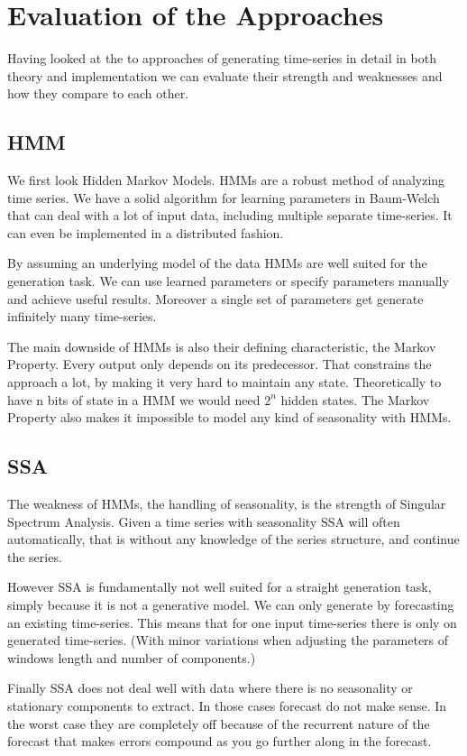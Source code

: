 
\chapter{Evaluation of the Approaches}\label{chapter:evaluation}

Having looked at the to approaches of generating time-series in detail in both theory and implementation we can evaluate their strength and weaknesses and how they compare to each other. 

\section{HMM}

We first look Hidden Markov Models. HMMs are a robust method of analyzing time series. We have a solid algorithm for learning parameters in Baum-Welch that can deal with a lot of input data, including multiple separate time-series. It can even be implemented in a distributed fashion. 

By assuming an underlying model of the data HMMs are well suited for the generation task. We can use learned parameters or specify parameters manually and achieve useful results. Moreover a single set of parameters get generate infinitely many time-series. 

The main downside of HMMs is also their defining characteristic, the Markov Property. Every output only depends on its predecessor. That constrains the approach a lot, by making it very hard to maintain any state. Theoretically to have n bits of state in a HMM we would need $2^n$ hidden states. The Markov Property also makes it impossible to model any kind of seasonality with HMMs. 

\section{SSA}

The weakness of HMMs, the handling of seasonality, is the strength of Singular Spectrum Analysis. Given a time series with seasonality SSA will often automatically, that is without any knowledge of the series structure, and continue the series. 

However SSA is fundamentally not well suited for a straight generation task, simply because it is not a generative model. We can only generate by forecasting an existing time-series. This means that for one input time-series there is only on generated time-series. (With minor variations when adjusting the parameters of windows length and number of components.)

Finally SSA does not deal well with data where there is no seasonality or stationary components to extract. In those cases forecast do not make sense. In the worst case they are completely off because of the recurrent nature of the forecast that makes errors compound as you go further along in the forecast. 